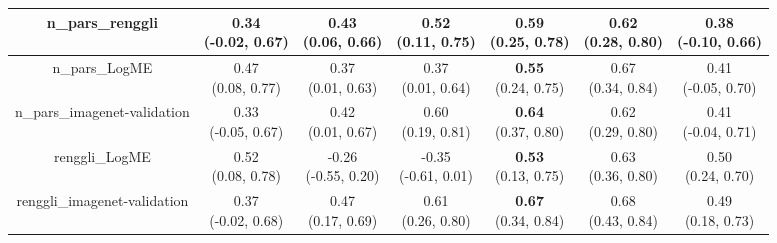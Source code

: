 \begin{table}[H]
\begin{tabular}{c|cccccc}
\hline
n_pars_renggli & \makecell{0.34 \\[0pt] (-0.02, 0.67)} & \makecell{0.43 \\[0pt] (0.06, 0.66)} & \makecell{0.52 \\[0pt] (0.11, 0.75)} & \makecell{\textbf{0.59} \\[0pt] (0.25, 0.78)} & \makecell{0.62 \\[0pt] (0.28, 0.80)} & \makecell{0.38 \\[0pt] (-0.10, 0.66)} \\
\hline
n_pars_LogME & \makecell{0.47 \\[0pt] (0.08, 0.77)} & \makecell{0.37 \\[0pt] (0.01, 0.63)} & \makecell{0.37 \\[0pt] (0.01, 0.64)} & \makecell{\textbf{0.55} \\[0pt] (0.24, 0.75)} & \makecell{0.67 \\[0pt] (0.34, 0.84)} & \makecell{0.41 \\[0pt] (-0.05, 0.70)} \\
\hline
n_pars_imagenet-validation & \makecell{0.33 \\[0pt] (-0.05, 0.67)} & \makecell{0.42 \\[0pt] (0.01, 0.67)} & \makecell{0.60 \\[0pt] (0.19, 0.81)} & \makecell{\textbf{0.64} \\[0pt] (0.37, 0.80)} & \makecell{0.62 \\[0pt] (0.29, 0.80)} & \makecell{0.41 \\[0pt] (-0.04, 0.71)} \\
\hline
renggli_LogME & \makecell{0.52 \\[0pt] (0.08, 0.78)} & \makecell{-0.26 \\[0pt] (-0.55, 0.20)} & \makecell{-0.35 \\[0pt] (-0.61, 0.01)} & \makecell{\textbf{0.53} \\[0pt] (0.13, 0.75)} & \makecell{0.63 \\[0pt] (0.36, 0.80)} & \makecell{0.50 \\[0pt] (0.24, 0.70)} \\
\hline
renggli_imagenet-validation & \makecell{0.37 \\[0pt] (-0.02, 0.68)} & \makecell{0.47 \\[0pt] (0.17, 0.69)} & \makecell{0.61 \\[0pt] (0.26, 0.80)} & \makecell{\textbf{0.67} \\[0pt] (0.34, 0.84)} & \makecell{0.68 \\[0pt] (0.43, 0.84)} & \makecell{0.49 \\[0pt] (0.18, 0.73)} \\

\end{tabular}
\end{table}
